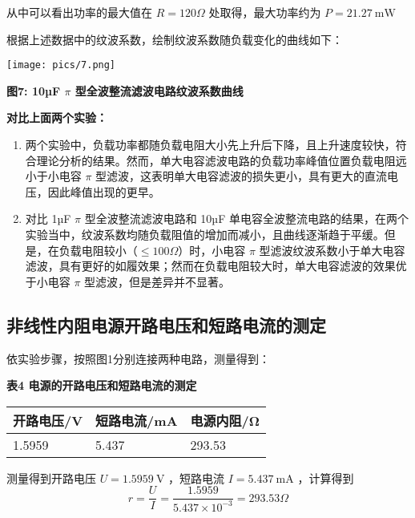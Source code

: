 \documentclass[10pt,a4paper]{article}
\makeatletter
\newenvironment{figurehere}
{\def\@captype{figure}}
{}
\newenvironment{tablehere}
{\def\@captype{table}}
{}
\makeatother
\begin{document}
	从中可以看出功率的最大值在 $R = 120\Omega$ 处取得，最大功率约为 $P = 21.27 \mathrm{~mW}$ 

	根据上述数据中的纹波系数，绘制纹波系数随负载变化的曲线如下：

	\begin{figurehere}
		\centering
		\texttt{[image: pics/7.png]}
		\caption*{\bf 图7: 10µF $\pi$ 型全波整流滤波电路纹波系数曲线}
	\end{figurehere}

	{\bf 对比上面两个实验：}
	\begin{enumerate}
		\item 两个实验中，负载功率都随负载电阻大小先上升后下降，且上升速度较快，符合理论分析的结果。然而，单大电容滤波电路的负载功率峰值位置负载电阻远小于小电容 $\pi$ 型滤波，这表明单大电容滤波的损失更小，具有更大的直流电压，因此峰值出现的更早。
		\item 对比 1µF $\pi$ 型全波整流滤波电路和 10µF 单电容全波整流电路的结果，在两个实验当中，纹波系数均随负载阻值的增加而减小，且曲线逐渐趋于平缓。但是，在负载电阻较小（$\le 100 \Omega$）时，小电容 $\pi$ 型滤波纹波系数小于单大电容滤波，具有更好的如履效果；然而在负载电阻较大时，单大电容滤波的效果优于小电容 $\pi$ 型滤波，但是差异并不显著。
	\end{enumerate}

	\newpage
	\subsection{非线性内阻电源开路电压和短路电流的测定}

	依实验步骤，按照图1分别连接两种电路，测量得到：

	\begin{tablehere}
		\caption*{\bf 表4 电源的开路电压和短路电流的测定}
		\noindent	
		\begin{center}
			\begin{tabularx}{0.55\textwidth}{|Y|Y|Y|}
				\hline
				开路电压/V   & 短路电流/mA & 电源内阻/Ω \\    & 5.437 & 293.53 \\ \hline
			\end{tabularx}
			\vspace*{1em}
		\end{center}
	\end{tablehere}

	测量得到开路电压 $U = 1.5959\mathrm{~V}$ ，短路电流 $I = 5.437\mathrm{~mA}$ ，计算得到
	$$
	r = \frac{U}{I} =  \frac{1.5959}{5.437 \times 10^{-3}} = 293.53\Omega
	$$
\end{document}
